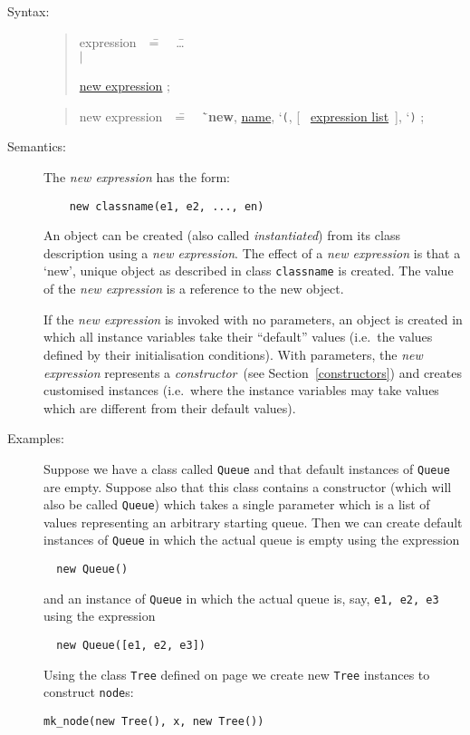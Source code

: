 \documentclass{overturerepchap}
\newcommand{\Lit}[1]{`{\tt #1}\Quote}
\newcommand{\Rule}[2]{
  \begin{quote}\begin{tabbing}
    #1\index{#1}\ \ \= = \ \ \= #2  ; %

  \end{tabbing}\end{quote}
  }
\newcommand{\Ruleref}[1]{
  \hyperlink{rule:#1}{#1}}
\newcommand{\dsep}{\\ \> $|$ \>}
\newcommand{\Lop}[1]{`{\bf\ttfamily #1}\Quote}
\newcommand{\OptPt}[1]{[\ #1\ ]}
\begin{document}
{\begin{description}
\item[Syntax:]
  \Rule{expression}{
    \ldots \dsep
    \Ruleref{new expression}
    }
  \Rule{new expression}{
    \Lop{new}, \Ruleref{name}, \Lit{(}, \OptPt{\Ruleref{expression list}}, \Lit{)}
  }

\item[Semantics:] The {\it new expression} has the form:

  \begin{lstlisting}
    new classname(e1, e2, ..., en)
  \end{lstlisting}
  An object can be created (also called {\em instantiated}) from its
  class description using a {\it new expression}. The effect of a
  {\it new expression} is that a `new', unique object as described in
  class {\tt classname} is created. The value of the {\it new
  expression} is a reference to the new object.

  If the {\it new expression} is invoked with no parameters, an
  object is created in which all instance variables take their
  ``default'' values (i.e.\ the values defined by their initialisation
  conditions). With parameters, the {\it new expression} represents a
  \emph{constructor}~(see Section~\ref{constructors}) and creates
  customised instances (i.e.\ where the instance variables may take
  values which are different from their default values).


\item[Examples:] Suppose we have a class called \texttt{Queue} and
  that default instances of \texttt{Queue} are empty. Suppose also
  that this class contains a constructor (which will also be called
  \texttt{Queue}) which takes a single parameter which is a list of
  values representing an arbitrary starting queue. Then we can
  create default  instances of \texttt{Queue} in which the actual
  queue is empty using the expression
\begin{lstlisting}
  new Queue()
\end{lstlisting}
and an instance of \texttt{Queue} in which the actual
  queue is, say, \texttt{e1, e2, e3} using the expression
\begin{lstlisting}
  new Queue([e1, e2, e3])
\end{lstlisting}

Using the class \texttt{Tree} defined on page \pageref{TreeDef} we create
new \texttt{Tree} instances to construct \texttt{node}s:
\begin{lstlisting}
mk_node(new Tree(), x, new Tree())
\end{lstlisting}



\end{description}}
\end{document}
